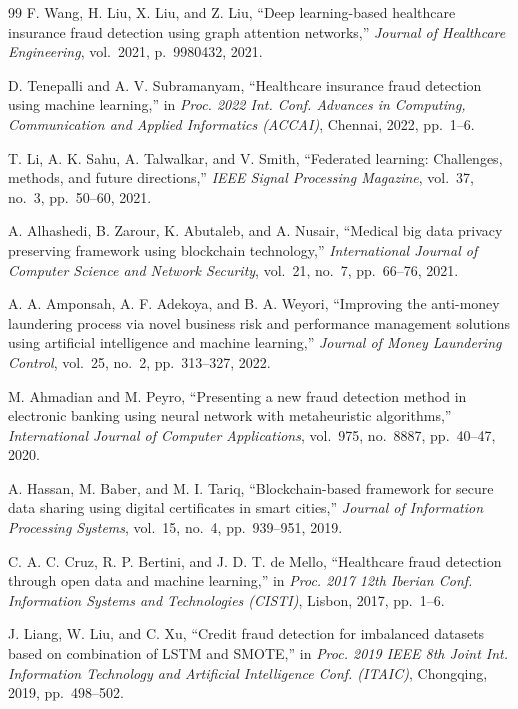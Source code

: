 \begin{thebibliography}{99}
F. Wang, H. Liu, X. Liu, and Z. Liu,
``Deep learning-based healthcare insurance fraud detection using graph attention networks,''
\textit{Journal of Healthcare Engineering},
vol.~2021, p.~9980432, 2021.

D. Tenepalli and A. V. Subramanyam,
``Healthcare insurance fraud detection using machine learning,''
in \textit{Proc. 2022 Int. Conf. Advances in Computing, Communication and Applied Informatics (ACCAI)},
Chennai, 2022, pp.~1--6.

T. Li, A. K. Sahu, A. Talwalkar, and V. Smith,
``Federated learning: Challenges, methods, and future directions,''
\textit{IEEE Signal Processing Magazine},
vol.~37, no.~3, pp.~50--60, 2021.

A. Alhashedi, B. Zarour, K. Abutaleb, and A. Nusair,
``Medical big data privacy preserving framework using blockchain technology,''
\textit{International Journal of Computer Science and Network Security},
vol.~21, no.~7, pp.~66--76, 2021.

A. A. Amponsah, A. F. Adekoya, and B. A. Weyori,
``Improving the anti-money laundering process via novel business risk and performance management solutions using artificial intelligence and machine learning,''
\textit{Journal of Money Laundering Control},
vol.~25, no.~2, pp.~313--327, 2022.

M. Ahmadian and M. Peyro,
``Presenting a new fraud detection method in electronic banking using neural network with metaheuristic algorithms,''
\textit{International Journal of Computer Applications},
vol.~975, no.~8887, pp.~40--47, 2020.

A. Hassan, M. Baber, and M. I. Tariq,
``Blockchain-based framework for secure data sharing using digital certificates in smart cities,''
\textit{Journal of Information Processing Systems},
vol.~15, no.~4, pp.~939--951, 2019.

C. A. C. Cruz, R. P. Bertini, and J. D. T. de Mello,
``Healthcare fraud detection through open data and machine learning,''
in \textit{Proc. 2017 12th Iberian Conf. Information Systems and Technologies (CISTI)},
Lisbon, 2017, pp.~1--6.

J. Liang, W. Liu, and C. Xu,
``Credit fraud detection for imbalanced datasets based on combination of LSTM and SMOTE,''
in \textit{Proc. 2019 IEEE 8th Joint Int. Information Technology and Artificial Intelligence Conf. (ITAIC)},
Chongqing, 2019, pp.~498--502.


\end{thebibliography}
